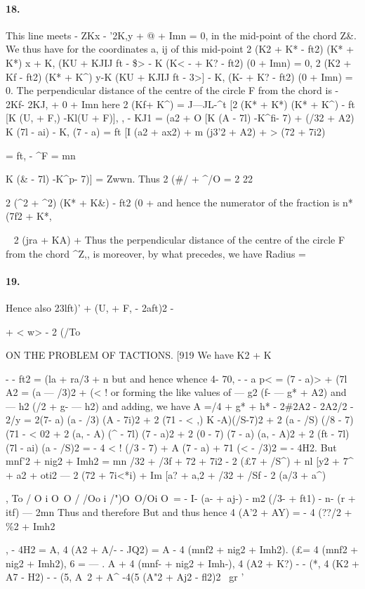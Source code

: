 \documentclass[11pt,a4paper]{book}
\begin{document}
{{{{{{{{{{{{{\paragraph{18.} This  line  meets
-  ZKx  -  '2K,y  +  @  +  Imn  =  0,
in   the   mid-point   of  the   chord   Z\&.     We    thus   have    for   the   coordinates   a,   ij   of  this
mid-point
2  (K2  +  K*  -  ft2)  (K*  +  K*)  x  +  K,  {(KU  +  KJIJ  ft  -  \$>}  -  K  (K< -  +  K?  -  ft2)  (0  +  Imn)  =  0,
2  (K2  +  Kf  -  ft2)  (K*  +  K^)  y-K  {(KU  +  KJIJ  ft  -  3>]     -  K,  (K-  +  K?  -  ft2)  (0  +  Imn)  =  0.
The  perpendicular  distance  of  the  centre  of  the  circle  F  from  the  chord  is
-  2Kf-  2KJ,  +  0  +  Imn
here
2  (Kf+  K^)  =  J---JL-^t  [2  (K*  +  K*)  (K*  +  K^)  -  ft  [K  (U,  +  F,)  -Kl(U  +  F)}],
,  -  KJ1  =     (a2  +  O  [K  (A  -  7l)  -K^fi-  7)
+  (/32  +  A2)  {K  (7l  -  ai)  -  K,  (7  -  a)}
=  ft  [I  (a2  +  ax2)  +  m  (j3'2  +  A2)  +  >   (72  +  7i2)}  =  ft\textregistered,
-  ^F  =  mn  {K  (\&  -  7l)  -K^p-  7)]  =  Zwwn.
Thus
2  (\#/  +  ^/O  =     2  22  {2  (^2  +  ^2)  (K*  +  K\&)  -  ft2  (0  +
and  hence  the  numerator  of  the  fraction  is
n*  (7f2  +  K*,  {~  2  (jra  +  KA)  +  \textregistered
Thus  the  perpendicular  distance  of  the  centre  of  the  circle  F  from  the  chord  ^Z,,  is
moreover,  by  what  precedes,  we  have
Radius  =
\paragraph{19.} Hence  also
23lft)'  +  (U,  +  F,  -  2aft)2  -  {\textcopyright  +  < w>   -  2  (/To


ON  THE  PROBLEM  OF  TACTIONS.
[919
We  have
K2  +  K}-  -  ft2  =  (la  +  ra/3  +  n
but
and  hence
whence
4-  70,  -
-  a
p<   =  (7  -  a)>   +  (7l
A2  =  (a  ---  /3)2  +  (< !
or   forming   the   like   values   of  ---  g2  (f-  ---  g*  +  A2)   and   ---  h2  (/2  +  g-  ---  h2)   and    adding,   we
have
A  =/4  +  g*  +  h*  -  2\#2A2  -  2A2/2  -  2/y
=  2(7-  a)  (a  -  /3)  (A  -  7i)2  +  2  (71  -  < ,)  K  -A)(/S-7)2
+  2  (a  -  /S)  (/8  -  7)  (71  -  < 02  +  2  (a,  -  A)  (^  -  7l)  (7  -  a)2
+  2  (0  -  7)  (7  -  a)  (a,  -  A)2  +  2  (ft  -  7l)  (7l  -  ai)  (a  -  /S)2
=  -  4  {< !  (/3  -  7)  +  A  (7  -  a)  +  71  (<   -  /3)}2  =  -  4H2.
But
mnf'2  +  nig2  +  Imh2  =  mn  {/32  +  /3f  +  72  +  7i2  -  2  (£7  +  /S^)}
+  nl  [y2  +  7^  +  a2  +  oti2  ---  2  (72  +  7i<*i)
+  Im  [a?  +  a,2  +  /32  +  /Sf  -  2  (a/3  +  a^)},
To    /       O       i  O\  O    /  /Oo       i         /")O\  O/Oi  O\
=  -  I-  (a-  +  aj-)  -  m2  (/3-  +  ft1)  -  n-  (r  +  itf)
---  2mn
Thus
and  therefore
But
and  thus
hence
4  (A'2  +  AY)  =  -  4  (??/2  +  \%2  +  Imh2},     -  4H2  =  A,
4  (A2  +  A/-  -  JQ2)  =  A  -  4  (mnf2  +  nig2  +  Imh2).
(£=  4  (mnf2  +  nig2  +  Imh2),
6  =  --- .  A  +  4  (mnf-  +  nig2  +  Imh-),
4  (A2  +  K?)          -  -  (*,
4  (K2  +  A7  -  H2)  -  -  (5,
A~2  +  A^  -4(5
(A"2  +  Aj2  -  fl2)2    ~gr  '


}}}}}}}}}}}}}
\end{document}
